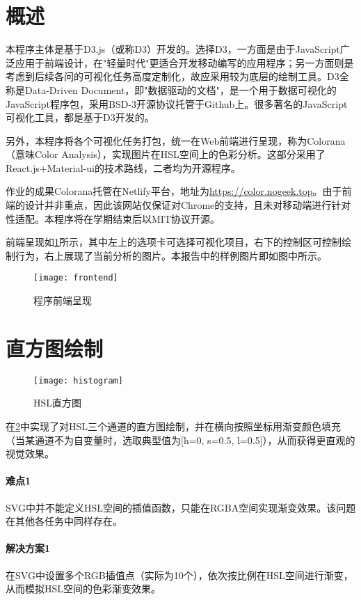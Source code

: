 \documentclass[a4paper,12pt]{article}
\begin{document}
    \section{概述}
    本程序主体是基于D3.js（或称D3）开发的。选择D3，一方面是由于JavaScript广泛应用于前端设计，在"轻量时代"更适合开发移动编写的应用程序；另一方面则是考虑到后续各问的可视化任务高度定制化，故应采用较为底层的绘制工具。D3全称是Data-Driven Document，即"数据驱动的文档"，是一个用于数据可视化的JavaScript程序包，采用BSD-3开源协议托管于Github上。很多著名的JavaScript可视化工具，都是基于D3开发的。

    另外，本程序将各个可视化任务打包，统一在Web前端进行呈现，称为Colorana（意味Color Analysis），实现图片在HSL空间上的色彩分析。这部分采用了React.js+Material-ui的技术路线，二者均为开源程序。

    作业的成果Colorana托管在Netlify平台，地址为\url{https://color.nogeek.top}。由于前端的设计并非重点，因此该网站仅保证对Chrome的支持，且未对移动端进行针对性适配。本程序将在学期结束后以MIT协议开源。

    前端呈现如\cref{fig:frontend}所示，其中左上的选项卡可选择可视化项目，右下的控制区可控制绘制行为，右上展现了当前分析的图片。本报告中的样例图片即如图中所示。
    \begin{figure}[htbp]
      \centering
      \texttt{[image: frontend]}
      \caption{程序前端呈现}
      \label{fig:frontend}
    \end{figure}
    \section{直方图绘制}
    \begin{figure}[htbp]
      \centering
      \texttt{[image: histogram]}
      \caption{HSL直方图}
      \label{fig:histogram}
    \end{figure}
    在\cref{fig:histogram}中实现了对HSL三个通道的直方图绘制，并在横向按照坐标用渐变颜色填充（当某通道不为自变量时，选取典型值为[h=0, s=0.5, l=0.5]），从而获得更直观的视觉效果。

    \paragraph{难点1} SVG中并不能定义HSL空间的插值函数，只能在RGBA空间实现渐变效果。该问题在其他各任务中同样存在。
    \paragraph{解决方案1} 在SVG中设置多个RGB插值点（实际为10个），依次按比例在HSL空间进行渐变，从而模拟HSL空间的色彩渐变效果。
\end{document}
